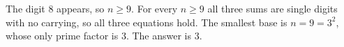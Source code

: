 The digit $8$ appears, so $n\ge9$. For every $n\ge9$ all three sums are single digits with no carrying, so all three equations hold. The smallest base is $n=9=3^2$, whose only prime factor is $3$. The answer is $\boxed{3}$.
